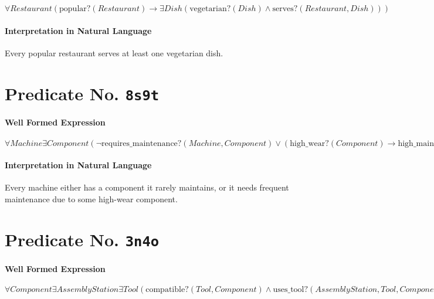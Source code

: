 \documentclass[11pt]{article}
\begin{document}
\(\forall \mathit{Restaurant} (\mathrm{popular?}(\mathit{Restaurant}) \rightarrow \exists \mathit{Dish} (\mathrm{vegetarian?}(\mathit{Dish}) \land \mathrm{serves?}(\mathit{Restaurant}, \mathit{Dish})))\)

\paragraph*{Interpretation in Natural Language}
\label{sec:org376a497}

Every popular restaurant serves at least one vegetarian dish.



\section{Predicate No. \texttt{8s9t}}
\label{sec:org2127cac}

\paragraph*{Well Formed Expression}
\label{sec:org6d7652e}

\(\forall \mathit{Machine} \exists \mathit{Component} (\neg \mathrm{requires\_maintenance?}(\mathit{Machine}, \mathit{Component}) \lor (\mathrm{high\_wear?}(\mathit{Component}) \rightarrow \mathrm{high\_maintenance\_frequency?}(\mathit{Machine})))\)

\paragraph*{Interpretation in Natural Language}
\label{sec:org8fc6e37}

Every machine either has a component it rarely maintains, or it needs frequent maintenance due to some high-wear component.



\section{Predicate No. \texttt{3n4o}}
\label{sec:org163e697}

\paragraph*{Well Formed Expression}
\label{sec:org335b8c4}

\(\forall \mathit{Component} \exists \mathit{AssemblyStation} \exists \mathit{Tool} (\mathrm{compatible?}(\mathit{Tool}, \mathit{Component}) \land \mathrm{uses\_tool?}(\mathit{AssemblyStation}, \mathit{Tool}, \mathit{Component}))\)
\end{document}
